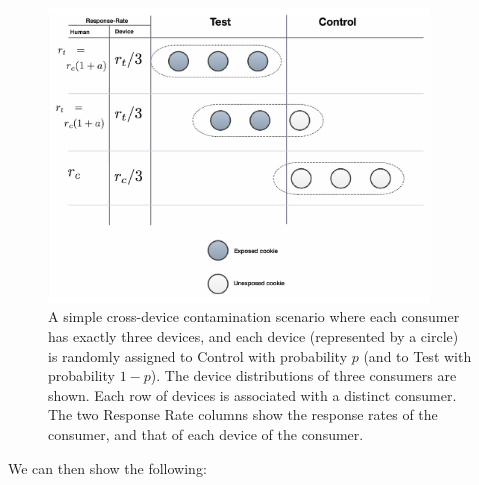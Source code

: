 \documentclass[11pt,a4paper]{article}
\theoremstyle{definition}
\theoremstyle{remark}
\theoremstyle{definition}
\theoremstyle{definition}
\theoremstyle{definition}
\theoremstyle{definition}
\theoremstyle{definition}
\theoremstyle{definition}
\begin{document}
\begin{figure}\centering
\includegraphics[width=0.9\textwidth]{contam-dilution.pdf}
\caption{\small A simple cross-device contamination scenario where each consumer has exactly three devices, and each device (represented by a circle) is randomly assigned to Control with probability $p$ (and to Test with probability $1-p$). The device distributions of three consumers are shown. Each row of devices is associated with a distinct consumer. The two Response Rate columns show the response rates of the consumer, and that of each device of the consumer.}
\label{fig-contam-dilution}
\end{figure}


We can then show the following:
\end{document}

